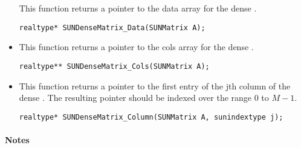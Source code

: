 \begin{itemize}
  This function returns a pointer to the data array for the dense .
 
  \verb|realtype* SUNDenseMatrix_Data(SUNMatrix A);|


\item {}

  This function returns a pointer to the cols array for the dense .
 
  \verb|realtype** SUNDenseMatrix_Cols(SUNMatrix A);|


\item {}

  This function returns a pointer to the first entry of the jth
  column of the dense .  The resulting pointer should
  be indexed over the range $0$ to $M-1$.
 
  \verb|realtype* SUNDenseMatrix_Column(SUNMatrix A, sunindextype j);|

\end{itemize}
\paragraph{\bf Notes}                                                      
           
